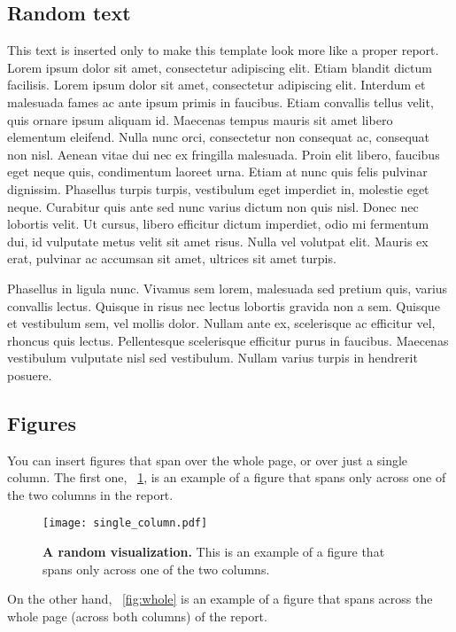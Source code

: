\documentclass[fleqn,moreauthors,10pt]{ds_report}
\begin{document}
	
	\subsection*{Random text}
	
	This text is inserted only to make this template look more like a proper report. Lorem ipsum dolor sit amet, consectetur adipiscing elit. Etiam blandit dictum facilisis. Lorem ipsum dolor sit amet, consectetur adipiscing elit. Interdum et malesuada fames ac ante ipsum primis in faucibus. Etiam convallis tellus velit, quis ornare ipsum aliquam id. Maecenas tempus mauris sit amet libero elementum eleifend. Nulla nunc orci, consectetur non consequat ac, consequat non nisl. Aenean vitae dui nec ex fringilla malesuada. Proin elit libero, faucibus eget neque quis, condimentum laoreet urna. Etiam at nunc quis felis pulvinar dignissim. Phasellus turpis turpis, vestibulum eget imperdiet in, molestie eget neque. Curabitur quis ante sed nunc varius dictum non quis nisl. Donec nec lobortis velit. Ut cursus, libero efficitur dictum imperdiet, odio mi fermentum dui, id vulputate metus velit sit amet risus. Nulla vel volutpat elit. Mauris ex erat, pulvinar ac accumsan sit amet, ultrices sit amet turpis.
	
	Phasellus in ligula nunc. Vivamus sem lorem, malesuada sed pretium quis, varius convallis lectus. Quisque in risus nec lectus lobortis gravida non a sem. Quisque et vestibulum sem, vel mollis dolor. Nullam ante ex, scelerisque ac efficitur vel, rhoncus quis lectus. Pellentesque scelerisque efficitur purus in faucibus. Maecenas vestibulum vulputate nisl sed vestibulum. Nullam varius turpis in hendrerit posuere.
	
	
	\subsection*{Figures}
	
	You can insert figures that span over the whole page, or over just a single column. The first one, \figurename~\ref{fig:column}, is an example of a figure that spans only across one of the two columns in the report.
	
	\begin{figure}[ht]\centering
		\texttt{[image: single\_column.pdf]}
		\caption{\textbf{A random visualization.} This is an example of a figure that spans only across one of the two columns.}
		\label{fig:column}
	\end{figure}
	
	On the other hand, \figurename~\ref{fig:whole} is an example of a figure that spans across the whole page (across both columns) of the report.
	
\end{document}
